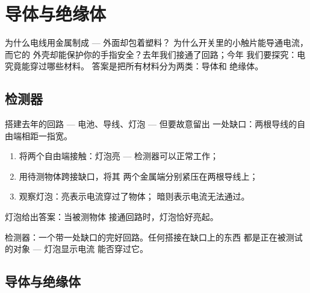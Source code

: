 \chapter{导体与绝缘体}\label{ch:g4:conductors-insulators}

为什么电线用金属制成 --- 外面却包着塑料？
为什么开关里的小触片能导通电流，而它的
外壳却能保护你的手指安全？去年我们接通了回路；今年
我们要探究：电究竟能穿过哪些材料。
答案是把所有材料分为两类：导体和
绝缘体。

\section{检测器}

\begin{method}[搭建检测器]\label{met:g4:conductors-insulators:tester}
搭建去年的回路 --- 电池、导线、灯泡 --- 但要故意留出
一处缺口：两根导线的自由端相距一指宽。
\begin{enumerate}
  \item 将两个自由端接触：灯泡亮 ---
        检测器可以正常工作；
  \item 用待测物体跨接缺口，将其
        两个金属端分别紧压在两根导线上；
  \item 观察灯泡：亮表示电流穿过了物体；
        暗则表示电流无法通过。
\end{enumerate}
灯泡给出答案：当被测物体
接通回路时，灯泡恰好亮起。
\end{method}

\begin{omfigure}

{\small 检测器：一个带一处缺口的完好回路。任何搭接在缺口上的东西
都是正在被测试的对象 --- 灯泡显示电流
能否穿过它。}
\end{omfigure}

\section{导体与绝缘体}

